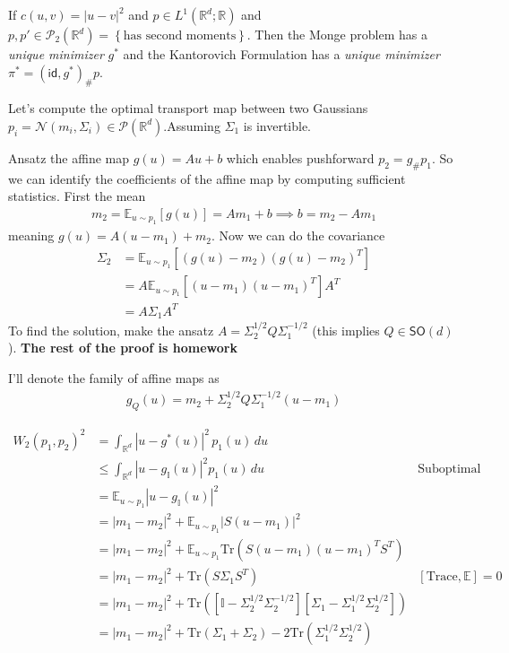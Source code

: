 \documentclass[11pt,fleqn]{article}
\numberwithin{equation}{section}
\theoremstyle{definition}
\theoremstyle{definition}
\begin{document}
\begin{theorem}
	If $c(u,v) = |u-v|^2$ and $p \in L^1(\mathbb R^d; \mathbb R)$ and $p,p' \in \mathcal P_2(\mathbb R^d) = \left\{ \text{has second moments} \right\}$. Then the Monge problem has a \emph{unique minimizer} $g^*$ and the Kantorovich Formulation has a \emph{unique minimizer} $\pi^* = (\textsf{id}, g^*)_\# p$.
\end{theorem}

\begin{eg}
	Let's compute the optimal transport map between two Gaussians $p_i = \mathcal N(m_i, \Sigma_i) \in \mathcal P(\mathbb R^d)$.Assuming $\Sigma_1$ is invertible.
	
	Ansatz the affine map $g(u) = Au+b$ which enables pushforward $p_2 = g_\# p_1$. So we can identify the coefficients of the affine map by computing sufficient statistics. First the mean
	\begin{align}
		m_2 = \mathbb E_{u \sim p_1} [g(u)] = A m_1 + b \implies b = m_2 - A m_1
	\end{align}
	meaning $g(u) = A(u - m_1) + m_2$. Now we can do the covariance
	\begin{align}
		\Sigma_2 & = \mathbb E_{u \sim p_1} [(g(u) - m_2)(g(u) - m_2)^T]\\
		& = A \mathbb E_{u \sim p_1}[(u - m_1)(u- m_1)^T]A^T\\
		& = A \Sigma_1 A^T
	\end{align}
	To find the solution, make the ansatz $A = \Sigma_2^{1/2} Q \Sigma_1^{-1/2}$ (this implies $Q \in \textsf{SO}(d)$). \textbf{The rest of the proof is homework}
	
	I'll denote the family of affine maps as
	\begin{align}
		g_Q(u) = m_2 + \Sigma_2^{1/2} Q \Sigma_1^{-1/2} (u- m_1)
	\end{align}
\end{eg}
\begin{align}
	W_2(p_1,p_2)^2 & = \int_{\mathbb R^d} |u- g^*(u)|^2 \, p_1(u) \, du\\
& \leq \int_{\mathbb R^d} |u - g_{\mathbb I}(u)|^2 p_1(u) \, du & \text{Suboptimal map}\\
& = \mathbb E_{u \sim p_1} |u - g_{\mathbb I}(u)|^2\\
& = |m_1 - m_2|^2 + \mathbb E_{u \sim p_1}|S(u - m_1)|^2\\
& = |m_1 - m_2|^2 + \mathbb E_{u \sim p_1} \text{Tr} \left( S(u-m_1) (u-m_1)^T S^T \right)\\
& = |m_1 - m_2|^2 + \text{Tr}(S \Sigma_1 S^T) & [\text{Trace}, \mathbb E] = 0\\
& = |m_1 - m_2|^2 + \text{Tr}\left( [\mathbb I - \Sigma_2^{1/2} \Sigma_2^{-1/2}][\Sigma_1 - \Sigma_1^{1/2} \Sigma_2^{1/2}] \right)\\
& = |m_1 - m_2|^2 + \text{Tr} \left( \Sigma_1 + \Sigma_2 \right) - 2 \text{Tr}(\Sigma_1^{1/2} \Sigma_2^{1/2})
\end{align}
\end{document}
